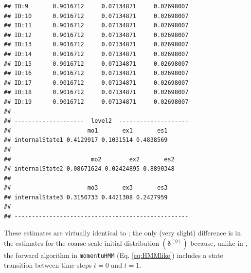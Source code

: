 \documentclass[12pt]{article}\usepackage[]{graphicx}\usepackage[]{xcolor}
\makeatletter
\newenvironment{kframe}{%
 \def\at@end@of@kframe{}%
 \ifinner\ifhmode%
  \def\at@end@of@kframe{\end{minipage}}%
  \begin{minipage}{\columnwidth}%
 \fi\fi%
 \def\FrameCommand##1{\hskip\@totalleftmargin \hskip-\fboxsep
 \colorbox{shadecolor}{##1}\hskip-\fboxsep
     \hskip-\linewidth \hskip-\@totalleftmargin \hskip\columnwidth}%
 \MakeFramed {\advance\hsize-\width
   \@totalleftmargin\z@ \linewidth\hsize
   \@setminipage}}%
 {\par\unskip\endMakeFramed%
 \at@end@of@kframe}
\newenvironment{knitrout}{}{} %
\makeatother
\begin{document}
\begin{knitrout}
\begin{kframe}
\begin{verbatim}
## ID:9       0.9016712     0.07134871     0.02698007
## ID:10      0.9016712     0.07134871     0.02698007
## ID:11      0.9016712     0.07134871     0.02698007
## ID:12      0.9016712     0.07134871     0.02698007
## ID:13      0.9016712     0.07134871     0.02698007
## ID:14      0.9016712     0.07134871     0.02698007
## ID:15      0.9016712     0.07134871     0.02698007
## ID:16      0.9016712     0.07134871     0.02698007
## ID:17      0.9016712     0.07134871     0.02698007
## ID:18      0.9016712     0.07134871     0.02698007
## ID:19      0.9016712     0.07134871     0.02698007
## 
## --------------------  level2  --------------------
##                      mo1       ex1       es1
## internalState1 0.4129917 0.1031514 0.4838569
## 
##                       mo2        ex2       es2
## internalState2 0.08671624 0.02424895 0.8890348
## 
##                      mo3       ex3       es3
## internalState3 0.3150733 0.4421308 0.2427959
## 
## --------------------------------------------------
\end{verbatim}
\end{kframe}
\end{knitrout}
\noindent These estimates are virtually identical to \cite{Leos-BarajasEtAl2017}; the only (very slight) difference is in the estimates for the coarse-scale initial distribution $({\boldsymbol \delta}^{(0)})$ because, unlike in \cite{Leos-BarajasEtAl2017}, the forward algorithm in \verb|momentuHMM| (Eq. \ref{eq:HMMlike}) includes a state transition between time steps $t=0$ and $t=1$.
\end{document}
